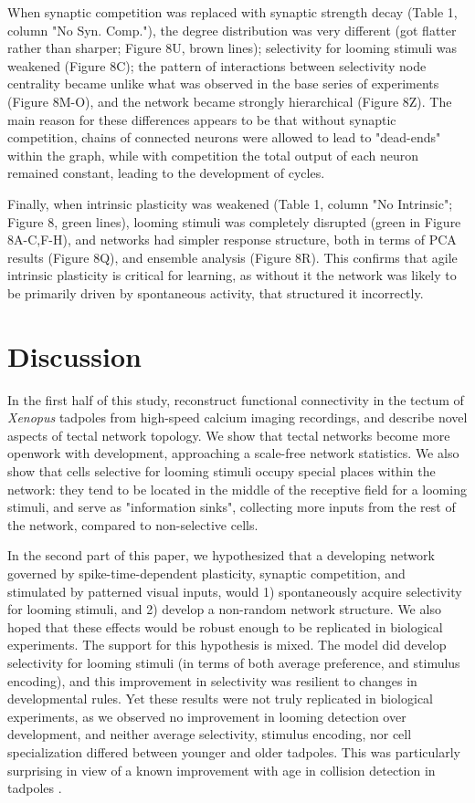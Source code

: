 \documentclass{article}
\begin{document}
When synaptic competition was replaced with synaptic strength decay (Table 1, column "No Syn. Comp."), the degree distribution was very different (got flatter rather than sharper; Figure 8U, brown lines); selectivity for looming stimuli was weakened (Figure 8C); the pattern of interactions between selectivity node centrality became unlike what was observed in the base series of experiments (Figure 8M-O), and the network became strongly hierarchical (Figure 8Z). The main reason for these differences appears to be that without synaptic competition, chains of connected neurons were allowed to lead to "dead-ends" within the graph, while with competition the total output of each neuron remained constant, leading to the development of cycles. 

Finally, when intrinsic plasticity was weakened (Table 1, column "No Intrinsic"; Figure 8, green lines), looming stimuli was completely disrupted (green in Figure 8A-C,F-H), and networks had simpler response structure, both in terms of PCA results (Figure 8Q), and ensemble analysis (Figure 8R). This confirms that agile intrinsic plasticity is critical for learning, as without it the network was likely to be primarily driven by spontaneous activity, that structured it incorrectly.

\section*{Discussion}

In the first half of this study, reconstruct functional connectivity in the tectum of \textit{Xenopus} tadpoles from high-speed calcium imaging recordings, and describe novel aspects of tectal network topology. We show that tectal networks become more openwork with development, approaching a scale-free network statistics. We also show that cells selective for looming stimuli occupy special places within the network: they tend to be located in the middle of the receptive field for a looming stimuli, and serve as "information sinks", collecting more inputs from the rest of the network, compared to non-selective cells.

In the second part of this paper, we hypothesized that a developing network governed by spike-time-dependent plasticity, synaptic competition, and stimulated by patterned visual inputs, would 1) spontaneously acquire selectivity for looming stimuli, and 2) develop a non-random network structure. We also hoped that these effects would be robust enough to be replicated in biological experiments. The support for this hypothesis is mixed. The model did develop selectivity for looming stimuli (in terms of both average preference, and stimulus encoding), and this improvement in selectivity was resilient to changes in developmental rules. Yet these results were not truly replicated in biological experiments, as we observed no improvement in looming detection over development, and neither average selectivity, stimulus encoding, nor cell specialization differed between younger and older tadpoles. This was particularly surprising in view of a known improvement with age in collision detection in tadpoles \citep{dong2009}.
\end{document}
